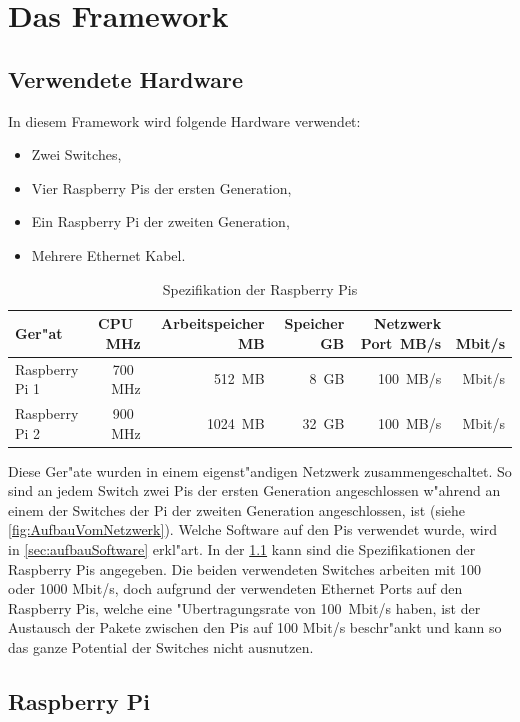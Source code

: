 \chapter{Das Framework}
\label{cha:framework}
\section{Verwendete Hardware} \label{sec:verwendeteHardware}

In diesem Framework wird folgende Hardware verwendet:

\begin{itemize}
\item Zwei Switches,
\item Vier Raspberry Pis der ersten Generation,
\item Ein Raspberry Pi der zweiten Generation,
\item Mehrere Ethernet Kabel.
\end{itemize}
\begin{table}
\centering
\begin{tabular}{l%
 r<{\,MHz}%
 r<{\,MB}%
 r<{\,GB}%
 r<{\,MB/s}%
 r<{\,Mbit/s}%
}
Ger"at 		& CPU	& Arbeitspeicher	& Speicher	& Netzwerk Port	\\
\hline
Raspberry Pi 1	& 700	& 512			& 8		& 100		\\
Raspberry Pi 2 	& 900 	& 1024			& 32		& 100		\\

\end{tabular}
\caption{Spezifikation der Raspberry Pis}
\label{tab:hardwarespezifiktion}
\end{table}

Diese Ger"ate wurden in einem eigenst"andigen Netzwerk zusammengeschaltet. So sind an jedem Switch zwei Pis %
der ersten Generation angeschlossen w"ahrend an einem der Switches der Pi der zweiten Generation angeschlossen, %
ist (siehe \cref{fig:AufbauVomNetzwerk}). Welche Software auf den Pis verwendet wurde, wird in \cref{sec:aufbauSoftware} erkl"art. %
In der \cref{tab:hardwarespezifiktion} kann sind die Spezifikationen der Raspberry Pis angegeben. %
Die beiden verwendeten Switches arbeiten mit 100 oder 1000 Mbit/s, doch aufgrund %
der verwendeten Ethernet Ports auf den Raspberry Pis, welche eine "Ubertragungsrate von \mbox{100 Mbit/s} haben, %
ist der Austausch der Pakete zwischen den Pis auf 100 Mbit/s beschr"ankt und kann so das ganze Potential der %
Switches nicht ausnutzen. %


\section{Raspberry Pi}

